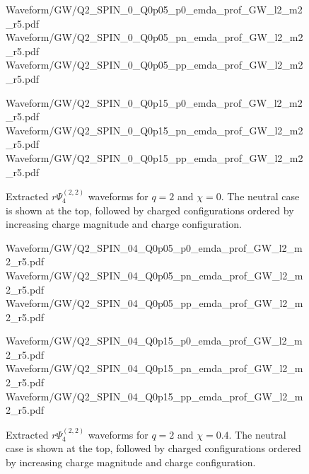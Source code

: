 \begin{figure}[p]
\centering
{}

\vspace{0.6em}

{Waveform/GW/Q2_SPIN_0_Q0p05_p0_emda_prof_GW_l2_m2_r5.pdf}
\hfill
{}
{Waveform/GW/Q2_SPIN_0_Q0p05_pn_emda_prof_GW_l2_m2_r5.pdf}
\hfill
{}
{Waveform/GW/Q2_SPIN_0_Q0p05_pp_emda_prof_GW_l2_m2_r5.pdf}

\vspace{0.6em}

{Waveform/GW/Q2_SPIN_0_Q0p15_p0_emda_prof_GW_l2_m2_r5.pdf}
\hfill
{}
{Waveform/GW/Q2_SPIN_0_Q0p15_pn_emda_prof_GW_l2_m2_r5.pdf}
\hfill
{}
{Waveform/GW/Q2_SPIN_0_Q0p15_pp_emda_prof_GW_l2_m2_r5.pdf}

\caption[Gravitational-wave catalog for $q=2$, $\chi=0$]{
Extracted $r\Psi_4^{(2,2)}$ waveforms for $q=2$ and $\chi=0$. The neutral case is shown at the top, followed by charged configurations ordered by increasing charge magnitude and charge configuration.
}
\label{fig:gw_catalog_q2_chi0}
\end{figure}

\begin{figure}[p]
\centering
{}

\vspace{0.6em}

{Waveform/GW/Q2_SPIN_04_Q0p05_p0_emda_prof_GW_l2_m2_r5.pdf}
\hfill
{}
{Waveform/GW/Q2_SPIN_04_Q0p05_pn_emda_prof_GW_l2_m2_r5.pdf}
\hfill
{}
{Waveform/GW/Q2_SPIN_04_Q0p05_pp_emda_prof_GW_l2_m2_r5.pdf}

\vspace{0.6em}

{Waveform/GW/Q2_SPIN_04_Q0p15_p0_emda_prof_GW_l2_m2_r5.pdf}
\hfill
{}
{Waveform/GW/Q2_SPIN_04_Q0p15_pn_emda_prof_GW_l2_m2_r5.pdf}
\hfill
{}
{Waveform/GW/Q2_SPIN_04_Q0p15_pp_emda_prof_GW_l2_m2_r5.pdf}

\caption[Gravitational-wave catalog for $q=2$, $\chi=0.4$]{
Extracted $r\Psi_4^{(2,2)}$ waveforms for $q=2$ and $\chi=0.4$. The neutral case is shown at the top, followed by charged configurations ordered by increasing charge magnitude and charge configuration.
}
\label{fig:gw_catalog_q2_chi04}
\end{figure}


